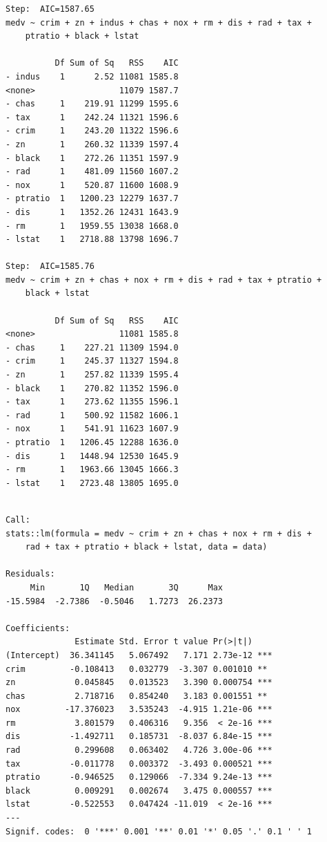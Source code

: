 \documentclass[
  letterpaper,
  DIV=11,
  numbers=noendperiod]{scrreprt}
\begin{document}
{\begin{verbatim}
Step:  AIC=1587.65
medv ~ crim + zn + indus + chas + nox + rm + dis + rad + tax + 
    ptratio + black + lstat

          Df Sum of Sq   RSS    AIC
- indus    1      2.52 11081 1585.8
<none>                 11079 1587.7
- chas     1    219.91 11299 1595.6
- tax      1    242.24 11321 1596.6
- crim     1    243.20 11322 1596.6
- zn       1    260.32 11339 1597.4
- black    1    272.26 11351 1597.9
- rad      1    481.09 11560 1607.2
- nox      1    520.87 11600 1608.9
- ptratio  1   1200.23 12279 1637.7
- dis      1   1352.26 12431 1643.9
- rm       1   1959.55 13038 1668.0
- lstat    1   2718.88 13798 1696.7

Step:  AIC=1585.76
medv ~ crim + zn + chas + nox + rm + dis + rad + tax + ptratio + 
    black + lstat

          Df Sum of Sq   RSS    AIC
<none>                 11081 1585.8
- chas     1    227.21 11309 1594.0
- crim     1    245.37 11327 1594.8
- zn       1    257.82 11339 1595.4
- black    1    270.82 11352 1596.0
- tax      1    273.62 11355 1596.1
- rad      1    500.92 11582 1606.1
- nox      1    541.91 11623 1607.9
- ptratio  1   1206.45 12288 1636.0
- dis      1   1448.94 12530 1645.9
- rm       1   1963.66 13045 1666.3
- lstat    1   2723.48 13805 1695.0
\end{verbatim}

\begin{verbatim}

Call:
stats::lm(formula = medv ~ crim + zn + chas + nox + rm + dis + 
    rad + tax + ptratio + black + lstat, data = data)

Residuals:
     Min       1Q   Median       3Q      Max 
-15.5984  -2.7386  -0.5046   1.7273  26.2373 

Coefficients:
              Estimate Std. Error t value Pr(>|t|)    
(Intercept)  36.341145   5.067492   7.171 2.73e-12 ***
crim         -0.108413   0.032779  -3.307 0.001010 ** 
zn            0.045845   0.013523   3.390 0.000754 ***
chas          2.718716   0.854240   3.183 0.001551 ** 
nox         -17.376023   3.535243  -4.915 1.21e-06 ***
rm            3.801579   0.406316   9.356  < 2e-16 ***
dis          -1.492711   0.185731  -8.037 6.84e-15 ***
rad           0.299608   0.063402   4.726 3.00e-06 ***
tax          -0.011778   0.003372  -3.493 0.000521 ***
ptratio      -0.946525   0.129066  -7.334 9.24e-13 ***
black         0.009291   0.002674   3.475 0.000557 ***
lstat        -0.522553   0.047424 -11.019  < 2e-16 ***
---
Signif. codes:  0 '***' 0.001 '**' 0.01 '*' 0.05 '.' 0.1 ' ' 1


\end{verbatim}}
\end{document}
